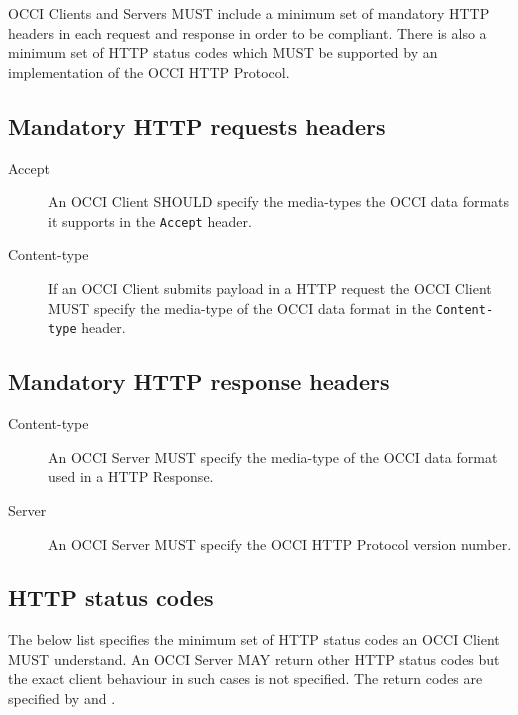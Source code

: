 \documentclass[10pt,a4paper]{article}
\begin{document}
OCCI Clients and Servers MUST include a minimum set of mandatory HTTP headers
in each request and response in order to be compliant.
There is also a minimum set of HTTP status codes which MUST be supported by
an implementation of the OCCI HTTP Protocol.

\subsection{Mandatory HTTP requests headers}

\begin{description}
\item[Accept] An OCCI Client SHOULD specify the media-types the OCCI data
formats it supports in the {\tt Accept} header.

\item[Content-type] If an OCCI Client submits payload in a HTTP request
the OCCI Client MUST specify the media-type of the OCCI data format
in the {\tt Content-type} header.
\end{description}

\subsection{Mandatory HTTP response headers}

\begin{description}
\item[Content-type] An OCCI Server MUST specify the media-type of the OCCI data
format used in a HTTP Response.
\item[Server] An OCCI Server MUST specify the OCCI HTTP Protocol version number.
\end{description}

\subsection{HTTP status codes}
The below list specifies the minimum set of HTTP status codes an OCCI Client MUST
understand. An OCCI Server MAY return other HTTP status codes but the exact client
behaviour in such cases is not specified. The return codes are specified by
\cite{rfc7231} and \cite{rfc7235}.
\end{document}
